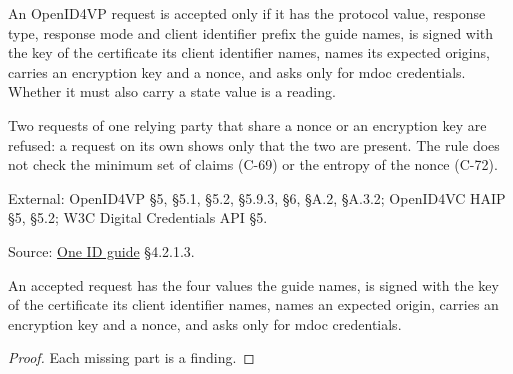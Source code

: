 \begin{definition}
  \label{def:openid4vp-request}
  An OpenID4VP request is accepted only if it has the protocol value, response
  type, response mode and client identifier prefix the guide names, is signed
  with the key of the certificate its client identifier names, names its
  expected origins, carries an encryption key and a nonce, and asks only for
  mdoc credentials.  Whether it must also carry a state value is a reading.

  Two requests of one relying party that share a nonce or an encryption key
  are refused: a request on its own shows only that the two are present.  The
  rule does not check the minimum set of claims (C-69) or the entropy of the
  nonce (C-72).

  External: OpenID4VP §5, §5.1, §5.2, §5.9.3, §6, §A.2, §A.3.2; OpenID4VC HAIP
  §5, §5.2; W3C Digital Credentials API §5.

  Source: \href{https://standards.atlassian.net/wiki/spaces/OneID/pages/2947416082/Technical+Implementation+Guide}{One ID guide} §4.2.1.3.
\end{definition}

\begin{theorem}
  \label{thm:openid4vp-request-parts}
  An accepted request has the four values the guide names, is signed with the
  key of the certificate its client identifier names, names an expected origin,
  carries an encryption key and a nonce, and asks only for mdoc credentials.
\end{theorem}
\begin{proof}
  Each missing part is a finding.
\end{proof}

